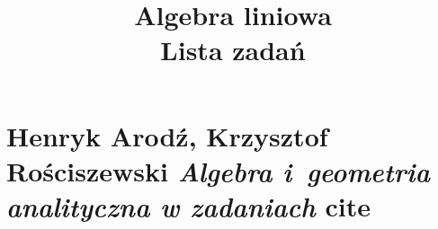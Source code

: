 \documentclass[a4paper,11pt]{article}
\title{Algebra liniowa \\
  {\Large Lista zadań}}
\numberwithin{equation}{section}
\begin{document}





\maketitle





\section{Henryk Arodź, Krzysztof Rościszewski
  \textit{Algebra i~geometria analityczna w zadaniach}
  cite{}}

\label{sec:Oznaczenia-i-konwencje}
\end{document}
